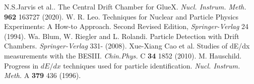 \begin{thebibliography}{ABC}
     N.S.Jarvis et al.. The Central Drift Chamber for GlueX. \emph{Nucl. Instrum. Meth.} \textbf{962} 163727 (2020).
     W. R. Leo. Techniques for Nuclear and Particle Physics Experiments: A How-to Approach. Second Revised Edition, \emph{Springer-Verlag} 24 (1994).
     Wa. Blum, W. Riegler and L. Rolandi. Particle Detection with Drift Chambers. \emph{Springer-Verlag} 331- (2008).
     Xue-Xiang Cao et al. Studies of dE/dx measurements with the BESIII. \emph{Chin.Phys.} C \textbf{34} 1852 (2010).
     M. Hauschild. Progress in $dE/dx$ techniques used for particle identification. \emph{Nucl. Instrum. Meth.} A \textbf{379} 436 (1996).

\end{thebibliography}

